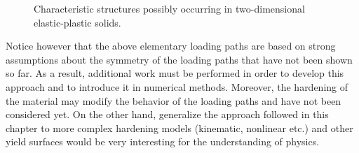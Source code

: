 \begin{figure}[h!]
  \centering
   \qquad 
   \qquad 
  \caption{Characteristic structures possibly occurring in two-dimensional elastic-plastic solids.}
  \label{fig:charac}
\end{figure}
Notice however that the above elementary loading paths are based on strong assumptions about the symmetry of the loading paths that have not been shown so far.
As a result, additional work must be performed in order to develop this approach and to introduce it in numerical methods.
Moreover, the hardening of the material may modify the behavior of the loading paths and have not been considered yet.
On the other hand, generalize the approach followed in this chapter to more complex hardening models (kinematic, nonlinear etc.) and other yield surfaces would be very interesting for the understanding of physics.


